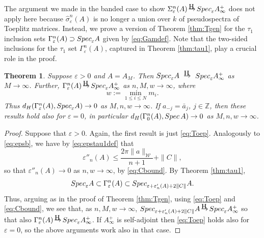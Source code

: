 \documentclass[preprint,1p,11pt]{elsarticle}
\newcommand\Z{{\mathbb Z}}
\newcommand\eps{{\varepsilon}}
\newcommand\Spec{{\rm Spec}\,}  %
\newcommand\Specn{{\rm Spec}}   %
\newcommand\Speps{{\rm Spec}_\eps}
\newcommand\Hto{
   \unitlength0.1ex
   \begin{picture}(30,15)
   \put(13,16){\makebox(0,0)[]{\tiny\rm H}}
   \put(15,5){\makebox(0,0)[]{$\to$}}
   \end{picture}
}
\newtheorem{theorem}{Theorem}[section]
\numberwithin{equation}{section}   %
\numberwithin{figure}{section}  %
\begin{document}
The argument we made in the banded case to show $\Sigma_\eps^n(A)\Hto \Speps A_\infty^{+}$ does not apply here because $\widehat \sigma_\eps^n(A)$ is no longer a union over $k$ of pseudospectra of Toeplitz matrices. %
Instead, we prove a version of Theorem \ref{thm:Tgen} for the $\tau_1$ inclusion sets $\Gamma_\eps^n(A)\supset \Speps A$ given by \eqref{eq:Gamdef}. Note that the two-sided inclusions for the $\tau_1$ set $\Gamma_\eps^n(A)$, captured in Theorem \ref{thm:tau1}, play a crucial role in the proof.

\begin{theorem} \label{thm:final}
Suppose $\eps>0$ and $A=A_M$. Then $\Speps A$ $\Hto$ $\Speps A_\infty^{+}$ as $M\to\infty$. Further, $\Gamma_\eps^n(A)\Hto  \Speps A_\infty^{+}$ as $n,M,w\to\infty$, where
\begin{equation} \nonumber %
w:= \min_{1\leq i\leq N} m_i.
\end{equation}
Thus $d_H(\Gamma_\eps^n(A),\Speps A)\to 0$ as  $M,n,w\to\infty$.  If $a_{-j} = \bar a_j$, $j\in \Z$, then these results hold also for $\eps=0$, in particular $d_H(\Gamma_0^n(A),\Spec A)\to 0$ as  $M,n,w\to\infty$.
\end{theorem}
\begin{proof} Suppose that $\eps>0$. Again, the first result is just \eqref{eq:Toep}. Analogously to \eqref{eq:epsb}, we have by \eqref{eq:epstau1def} that
$$
\eps''_{n}(A) \leq \frac{2\pi \|a\|_{\mathcal{W}}}{n+1} + \|C\|,
$$
so that $\eps''_{n}(A) \to 0$ as $n,w\to\infty$, by \eqref{eq:Cbound}.
By Theorem \ref{thm:tau1}, 
$$\Speps A \subset \Gamma_{\eps}^n(A) \subset \Specn_{\eps+\eps'_n(A) + 2\|C\|} A.$$ 
Thus, arguing as in the proof of Theorem \ref{thm:Tgen}, using \eqref{eq:Toep} and \eqref{eq:Cbound}, we see that, as $n,M,w\to\infty$, $\Specn_{\eps+\eps'_n(A) + 2\|C\|} A\Hto \Speps A_\infty^{+}$  so that also $\Gamma_\eps^n(A)\Hto  \Speps A_\infty^{+}$.
If $A_\infty^{+}$ is self-adjoint then \eqref{eq:Toep} holds also for $\eps=0$, so the above arguments work also in that case. 
\end{proof}

\vspace{-2ex}
\end{document}
